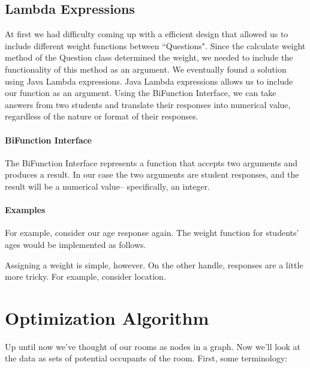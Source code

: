 \documentclass[12pt]{article}
\begin{document}
\subsection{Lambda Expressions}
At first we had difficulty coming up with a efficient design that allowed us to include different weight functions between ``Questions". Since the calculate weight method of the Question class determined the weight, we needed to include the functionality of this method as an argument. We eventually found a solution using Java Lambda expressions. Java Lambda expressions allows us to include our function as an argument. Using the BiFunction Interface, we can take answers from two students and translate their responses into numerical value, regardless of the nature or format of their responses. 

\paragraph{BiFunction Interface}
The BiFunction Interface represents a function that accepts two arguments and produces a result. In our case the two arguments are student responses, and the result will be a numerical value-- specifically, an integer. 

\paragraph{Examples}
For example, consider our age response again. The weight function for students' ages would be implemented as follows.


Assigning a weight is simple, however. On the other handle, responses are a little more tricky. For example, consider location. 


\section{Optimization Algorithm}

Up until now we've thought of our rooms as nodes in a graph. Now we'll look at the data as sets of potential occupants of the room. First, some terminology:\\
\end{document}
